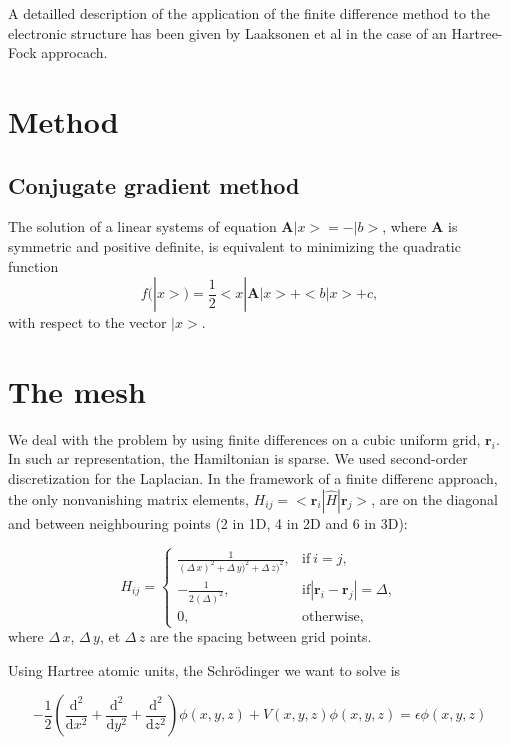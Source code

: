 \documentclass[11pt,a4paper]{article}
\begin{document}
A detailled description of the application of the finite difference method to the electronic structure has been given by Laaksonen et al in the case of an Hartree-Fock approcach\cite{laaksonen1986}.

\section{Method}

\subsection{Conjugate gradient method}

The solution of a linear systems of equation $\bm{A}|x>=-|b>$, where $\bm{A}$ is symmetric and positive definite, is equivalent to minimizing the quadratic function
\begin{equation}
  f(|x>)=\frac{1}{2}<x|\bm{A}|x>+<b|x>+c,
\end{equation}
with respect to the vector $|x>$.


\section{The mesh}

We deal with the problem by using finite differences on a cubic uniform grid, ${\bm{r}_i}$.
In such ar representation,  the Hamiltonian is sparse.
We used second-order discretization for the Laplacian. In the framework of a finite differenc approach, the only nonvanishing matrix elements, $H_{ij}=<\bm{r}_i|\hat{H}|\bm{r}_j>$, are on the diagonal and between neighbouring points (2 in 1D, 4 in 2D and 6 in 3D):


  \begin{equation}
    H_{ij}=
    \begin{cases}
      \frac{1}{(\Delta\,x)^2+\Delta\,y)^2+\Delta\,z)^2}, & \text{if}\ i=j, \\
      -\frac{1}{2(\Delta)^2}, & \text{if} |\bm{r}_i-\bm{r}_j|=\Delta,\\
      0,&\text{otherwise,}
    \end{cases}
  \end{equation}
where $\Delta\,x$, $\Delta\,y$, et $\Delta\,z$ are the spacing between grid points.



Using Hartree atomic units, the Schr\"odinger we want to solve is 


\begin{equation}
  \label{eq:1}
  -\frac{1}{2}\left(\frac{\mathrm{d}^2}{\mathrm{d}x^2}+\frac{\mathrm{d}^2}{\mathrm{d}y^2}+\frac{\mathrm{d}^2}{\mathrm{d}z^2}\right)\phi(x,y,z)+V(x,y,z)\phi(x,y,z)=\epsilon\phi(x,y,z)
\end{equation}
\end{document}
